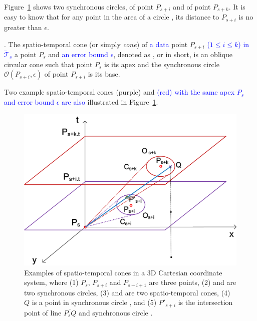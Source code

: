 Figure~\ref{fig:cis} shows two synchronous circles,  of point $P_{s+i}$ and  of point $P_{s+k}$.
It is easy to know that for any point in the area of a circle , its distance to $P_{s+i}$ is no greater than $\epsilon$.





. The spatio-temporal cone (or simply \textit{cone}) of \textcolor{blue}{a data} point $P_{s+i}$ \textcolor{blue}{($1\le i\le k$) in $\dddot{\mathcal{T}}_s$} \wrt a point $P_s$ and \textcolor{blue}{an error bound $\epsilon$}, denoted as , or  in short, is an oblique circular cone such that point $P_s$ is its apex and the synchronous circle $\mathcal{O}(P_{s+i}, \epsilon)$ of point $P_{s+i}$ is its base.

Two example spatio-temporal cones  {(purple)} and  \textcolor{blue}{(red) with the same apex $P_s$ and error bound $\epsilon$ are also} illustrated in Figure~\ref{fig:cis}.



\begin{figure}[tb!]
	\centering
	\includegraphics[scale=0.66]{figures/Fig-cis.png}
	\caption{\small Examples of spatio-temporal cones in a 3D Cartesian coordinate system, where (1) $P_s$, $P_{s+i}$ and $P_{s+i+1}$ are three points, (2)  and  are two synchronous circles, (3)  and  are two spatio-temporal cones, (4) $Q$ is a point in synchronous circle , and (5) $P'_{s+i}$ is the intersection point of line $\overline{P_sQ}$ and synchronous circle .}
	\vspace{-2ex}
	\label{fig:cis}
\end{figure}

